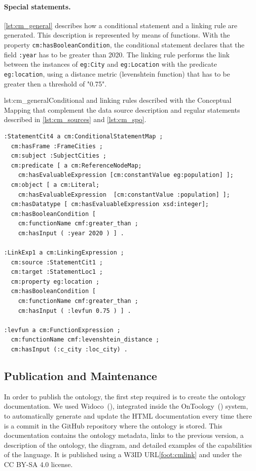 \noindent\paragraph{\textbf{Special statements.}} \cref{lst:cm_general} describes how a conditional statement and a linking rule are generated. This description is represented by means of functions. With the property \texttt{cm:hasBooleanCondition}, the conditional statement declares that the field \texttt{:year} has to be greater than 2020. The linking rule performs the link between the instances of \texttt{eg:City} and \texttt{eg:Location} with the predicate \texttt{eg:location}, using a distance metric (levenshtein function) that has to be greater then a threshold of "0.75". 

\begin{captionedlisting}{lst:cm_general}{Conditional and linking rules described with the Conceptual Mapping that complement the data source description and regular statements described in \cref{lst:cm_sources} and \cref{lst:cm_spo}.}
\centering
{\begin{lstlisting}[language=concm,firstnumber=1]
:StatementCit4 a cm:ConditionalStatementMap ;
  cm:hasFrame :FrameCities ;
  cm:subject :SubjectCities ;
  cm:predicate [ a cm:ReferenceNodeMap; 
    cm:hasEvaluableExpression [cm:constantValue eg:population] ];
  cm:object [ a cm:Literal; 
    cm:hasEvaluableExpression  [cm:constantValue :population] ];
  cm:hasDatatype [ cm:hasEvaluableExpression xsd:integer];
  cm:hasBooleanCondition [
    cm:functionName cmf:greater_than ;
    cm:hasInput ( :year 2020 ) ] .

:LinkExp1 a cm:LinkingExpression ;
  cm:source :StatementCit1 ;
  cm:target :StatementLoc1 ;
  cm:property eg:location ;
  cm:hasBooleanCondition [
    cm:functionName cmf:greater_than ; 
    cm:hasInput ( :levfun 0.75 ) ] .

:levfun a cm:FunctionExpression ;
  cm:functionName cmf:levenshtein_distance ;    
  cm:hasInput (:c_city :loc_city) .
\end{lstlisting}}
\end{captionedlisting}






\subsection{Publication and Maintenance}
\label{sec:chp4_pub-main}

In order to publish the ontology, the first step required is to create the ontology documentation. We used Widoco~(\cite{garijo2017widoco}), integrated inside the OnToology~(\cite{alobaid2019automating}) system, to automatically generate and update the HTML documentation every time there is a commit in the GitHub repository where the ontology is stored. This documentation contains the ontology metadata, links to the previous version, a description of the ontology, the diagram, and detailed examples of the capabilities of the language. It is published using a W3ID URL\cref{foot:cmlink} and under the CC BY-SA 4.0 license.

